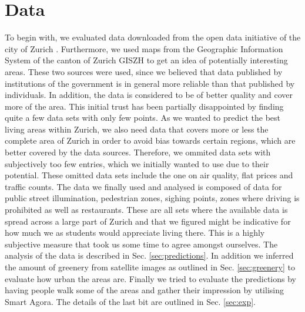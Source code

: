 \documentclass[letterpaper]{article}
\begin{document}
\section{Data}\label{sec:data}
To begin with, we evaluated data downloaded from the open data initiative of the city of Zurich \cite{ZurichOD}.
Furthermore, we used maps from the Geographic Information System of the canton of Zurich GISZH \cite{GISZH} to get
an idea of potentially interesting areas.
These two sources were used, since we believed that data published by institutions of the government is in general
more reliable than that published by individuals. In addition, the data is considered to be of better quality and
cover more of the area. This initial trust has been partially disappointed by finding quite a few data sets with only few points.
As we wanted to predict the best living areas within Zurich, we also need data that covers more or less the complete area of Zurich
in order to avoid bias towards certain regions, which are better covered by the data sources. Therefore, we ommited data sets
with subjectively too few entries, which we initially wanted to use due to their potential. These omitted data sets include
the one on air quality, flat prices and traffic counts.
The data we finally used and analysed is composed of data for public street illumination, pedestrian zones, sighing points,
zones where driving is prohibited as well as restaurants. These are all sets where the available data is spread across
a large part of Zurich and that we figured might be indicative for how much we as students would appreciate living there.
This is a highly subjective measure that took us some time to agree amongst ourselves.
The analysis of the data is described in Sec. \ref{sec:predictions}. In addition we inferred the amount of greenery from satellite
images as outlined in Sec. \ref{sec:greenery} to evaluate how urban the areas are. Finally we tried to evaluate the predictions
by having people walk some of the areas and gather their impression by utilising Smart Agora. The details of the last bit
are outlined in Sec. \ref{sec:exp}.
\end{document}
